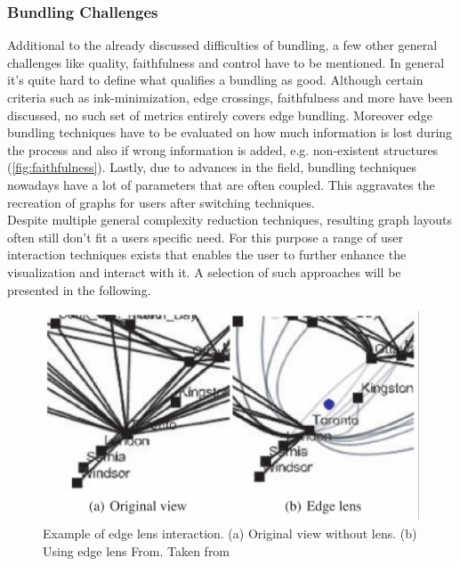 \subsubsection{Bundling Challenges}
Additional to the already discussed difficulties of bundling, a few other general challenges like quality, faithfulness and control have to be mentioned.
In general it's quite hard to define what qualifies a bundling as good. Although certain criteria such as ink-minimization, edge crossings, faithfulness and more have been discussed, no such set of metrics entirely covers edge bundling\cite{Lhuillier2017}. 
Moreover edge bundling techniques have to be evaluated on how much information is lost during the process and also if wrong information is added, e.g. non-existent structures (\autoref{fig:faithfulness}). Lastly, due to advances in the field, bundling techniques nowadays have a lot of parameters that are often coupled. This aggravates the recreation of graphs for users after switching techniques.\\
Despite multiple general complexity reduction techniques, resulting graph layouts often still don't fit a users specific need. 
For this purpose a range of user interaction techniques exists that enables the user to further enhance the visualization and interact with it. A selection of such approaches will be presented in the following. 

\begin{figure}
    \centering
    \includegraphics{media/edge_lense.pdf}
    \caption{Example of edge lens interaction. (a) Original view without lens. (b) Using edge lens From. Taken from \cite{VonLandesberger2011}}
    \label{fig:edge_lense}
\end{figure}
